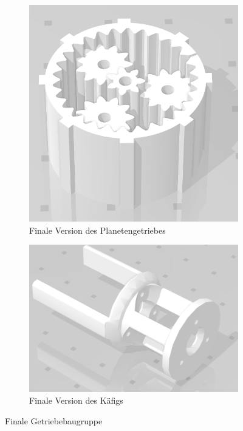 \begin{figure}[H]
	\centering
	\begin{subfigure}[b]{0.4\textwidth}
		\includegraphics[width=\textwidth]{bilder/currGetr.png}
		\caption{Finale Version des Planetengetriebes}
		\label{bild:currGetr}
	\end{subfigure}
	\hspace{0.1\textwidth}%
	\begin{subfigure}[b]{0.4\textwidth}
		\includegraphics[width=\textwidth]{bilder/currKaefig.png}
		\caption{Finale Version des Käfigs}
		\label{bild:currKaefig}
	\end{subfigure}
	\caption{Finale Getriebebaugruppe}
\end{figure}



